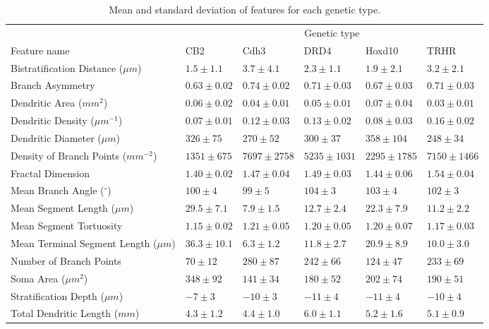 \documentclass[11pt]{article}
\begin{document}
\clearpage

%
%

\begin{sidewaystable}
\begin{tabular}{llllll}
\toprule
 & \multicolumn{5}{c}{Genetic type}\\
Feature name & CB2 & Cdh3 & DRD4 & Hoxd10 & TRHR\\
\midrule
Bistratification Distance ($\mu m$)& $1.5 \pm 1.1$& $3.7 \pm 4.1$& $2.3 \pm 1.1$& $1.9 \pm 2.1$& $3.2 \pm 2.1$\\
Branch Asymmetry& $0.63 \pm 0.02$& $0.74 \pm 0.02$& $0.71 \pm 0.03$& $0.67 \pm 0.03$& $0.71 \pm 0.03$\\
Dendritic Area ($mm^2$)& $0.06 \pm 0.02$& $0.04 \pm 0.01$& $0.05 \pm 0.01$& $0.07 \pm 0.04$& $0.03 \pm 0.01$\\
Dendritic Density ($\mu m^{-1}$)& $0.07 \pm 0.01$& $0.12 \pm 0.03$& $0.13 \pm 0.02$& $0.08 \pm 0.03$& $0.16 \pm 0.02$\\
Dendritic Diameter ($\mu m$)& $326 \pm 75$& $270 \pm 52$& $300 \pm 37$& $358 \pm 104$& $248 \pm 34$\\
Density of Branch Points ($mm^{-2}$)& $1351 \pm 675$& $7697 \pm 2758$& $5235 \pm 1031$& $2295 \pm 1785$& $7150 \pm 1466$\\
Fractal Dimension& $1.40 \pm 0.02$& $1.47 \pm 0.04$& $1.49 \pm 0.03$& $1.44 \pm 0.06$& $1.54 \pm 0.04$\\
Mean Branch Angle ($^\circ$)& $100 \pm 4$& $99 \pm 5$& $104 \pm 3$& $103 \pm 4$& $102 \pm 3$\\
Mean Segment Length ($\mu m$)& $29.5 \pm 7.1$& $7.9 \pm 1.5$& $12.7 \pm 2.4$& $22.3 \pm 7.9$& $11.2 \pm 2.2$\\
Mean Segment Tortuosity& $1.15 \pm 0.02$& $1.21 \pm 0.05$& $1.20 \pm 0.05$& $1.20 \pm 0.07$& $1.17 \pm 0.03$\\
Mean Terminal Segment Length ($\mu m$)& $36.3 \pm 10.1$& $6.3 \pm 1.2$& $11.8 \pm 2.7$& $20.9 \pm 8.9$& $10.0 \pm 3.0$\\
Number of Branch Points& $70 \pm 12$& $280 \pm 87$& $242 \pm 66$& $124 \pm 47$& $233 \pm 69$\\
Soma Area ($\mu m^2$)& $348 \pm 92$& $141 \pm 34$& $180 \pm 52$& $202 \pm 74$& $190 \pm 51$\\
Stratification Depth ($\mu m$)& $-7 \pm 3$& $-10 \pm 3$& $-11 \pm 4$& $-11 \pm 4$& $-10 \pm 4$\\
Total Dendritic Length ($mm$)& $4.3 \pm 1.2$& $4.4 \pm 1.0$& $6.0 \pm 1.1$& $5.2 \pm 1.6$& $5.1 \pm 0.9$\\
\bottomrule
\end{tabular}
\caption{Mean and standard deviation of features for each genetic type.}
\label{tab:featVals}
\end{sidewaystable}
\end{document}
